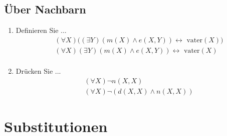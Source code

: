 \subsection{Über Nachbarn}
\begin{enumerate}
	\item Definieren Sie ...
	\begin{align*}
		&(\forall X)\Big((\exists Y)(m(X)\wedge e(X,Y))\leftrightarrow \text{ vater}(X)\Big)\\
		&(\forall X)(\exists Y)(m(X)\wedge e(X,Y))\leftrightarrow \text{ vater}(X)\\
	\end{align*}
	\item Drücken Sie ...
	\begin{align*}
	&(\forall X)\neg n(X,X)\\
	&(\forall X)\neg (d(X,X) \wedge n(X,X))
	\end{align*}
\end{enumerate}
\section{Substitutionen}
